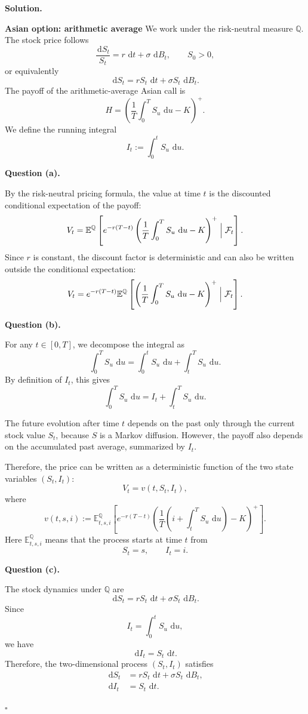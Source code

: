 \documentclass[11pt]{article}
\theoremstyle{plain}
\newcommand{\E}{\mathbb{E}}
\newcommand{\dd}{\,\mathrm{d}}
\newcommand{\F}{\mathcal{F}}
\newcommand{\1}{\mathbf{1}}
\theoremstyle{definition}
\newenvironment{solution}
{\par\medskip\noindent\textbf{Solution.}\par\medskip}
{\hfill$\square$\par\medskip}
\newenvironment{solutionpart}[1]
{\par\medskip\noindent\textbf{#1.}\par\smallskip}
{\par\medskip}
\begin{document}
\begin{solution}
\textbf{Asian option: arithmetic average}
We work under the risk-neutral measure $\mathbb{Q}$. The stock price follows
\[
\frac{\dd S_t}{S_t}=r\,\dd t+\sigma\,\dd B_t,
\qquad S_0>0,
\]
or equivalently
\[
\dd S_t=rS_t\,\dd t+\sigma S_t\,\dd B_t.
\]
The payoff of the arithmetic-average Asian call is
\[
H=
\left(
\frac1T\int_0^T S_u\,\dd u-K
\right)^+.
\]
We define the running integral
\[
I_t:=\int_0^t S_u\,\dd u.
\]

\begin{solutionpart}{Question (a)}
By the risk-neutral pricing formula, the value at time $t$ is the discounted conditional expectation of the payoff:
\[
V_t
=
\E^\mathbb{Q}\left[
e^{-r(T-t)}
\left(
\frac1T\int_0^T S_u\,\dd u-K
\right)^+
\Bigm|\F_t
\right].
\]
Since $r$ is constant, the discount factor is deterministic and can also be written outside the conditional expectation:
\[
V_t
=
e^{-r(T-t)}
\E^\mathbb{Q}\left[
\left(
\frac1T\int_0^T S_u\,\dd u-K
\right)^+
\Bigm|\F_t
\right].
\]
\end{solutionpart}

\begin{solutionpart}{Question (b)}
For any $t\in[0,T]$, we decompose the integral as
\[
\int_0^T S_u\,\dd u
=
\int_0^t S_u\,\dd u
+
\int_t^T S_u\,\dd u.
\]
By definition of $I_t$, this gives
\[
\int_0^T S_u\,\dd u
=
I_t+\int_t^T S_u\,\dd u.
\]

The future evolution after time $t$ depends on the past only through the current stock value $S_t$, because $S$ is a Markov diffusion. However, the payoff also depends on the accumulated past average, summarized by $I_t$.

Therefore, the price can be written as a deterministic function of the two state variables $(S_t,I_t)$:
\[
V_t=v(t,S_t,I_t),
\]
where
\[
v(t,s,i)
:=
\E_{t,s,i}^{\mathbb{Q}}\left[
e^{-r(T-t)}
\left(
\frac1T
\left(
i+\int_t^T S_u\,\dd u
\right)
-K
\right)^+
\right].
\]
Here $\E_{t,s,i}^{\mathbb{Q}}$ means that the process starts at time $t$ from
\[
S_t=s,
\qquad
I_t=i.
\]
\end{solutionpart}

\begin{solutionpart}{Question (c)}
The stock dynamics under $\mathbb{Q}$ are
\[
\dd S_t=rS_t\,\dd t+\sigma S_t\,\dd B_t.
\]
Since
\[
I_t=\int_0^t S_u\,\dd u,
\]
we have
\[
\dd I_t=S_t\,\dd t.
\]
Therefore, the two-dimensional process $(S_t,I_t)$ satisfies
\[
\boxed{
\begin{aligned}
\dd S_t &= rS_t\,\dd t+\sigma S_t\,\dd B_t,\\
\dd I_t &= S_t\,\dd t.
\end{aligned}
}
\]


\end{solutionpart}
\end{solution}
\end{document}

